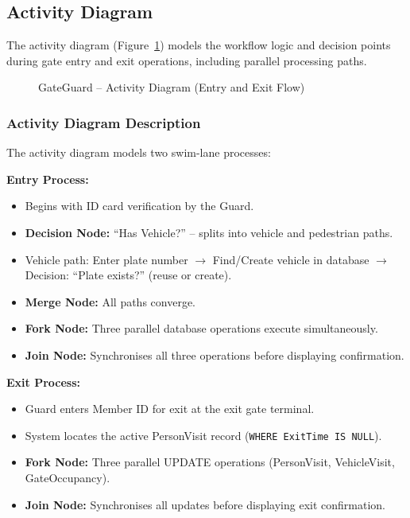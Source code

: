 \documentclass[a4paper, 12pt]{article}
\begin{document}
\newpage
\subsection{Activity Diagram}
\label{subsec:activity}

The activity diagram (Figure~\ref{fig:activity}) models the workflow logic and decision points during gate entry and exit operations, including parallel processing paths.

\begin{figure}[H]
    \centering
    \mbox{}
    \caption{GateGuard -- Activity Diagram (Entry and Exit Flow)}
    \label{fig:activity}
\end{figure}

\newpage
\mbox{}
\newpage


\subsubsection{Activity Diagram Description}

The activity diagram models two swim-lane processes:

\textbf{Entry Process:}
\begin{itemize}[leftmargin=*, nosep]
    \item Begins with ID card verification by the Guard.
    \item \textbf{Decision Node:} ``Has Vehicle?'' -- splits into vehicle and pedestrian paths.
    \item Vehicle path: Enter plate number $\rightarrow$ Find/Create vehicle in database $\rightarrow$ Decision: ``Plate exists?'' (reuse or create).
    \item \textbf{Merge Node:} All paths converge.
    \item \textbf{Fork Node:} Three parallel database operations execute simultaneously.
    \item \textbf{Join Node:} Synchronises all three operations before displaying confirmation.
\end{itemize}

\textbf{Exit Process:}
\begin{itemize}[leftmargin=*, nosep]
    \item Guard enters Member ID for exit at the exit gate terminal.
    \item System locates the active PersonVisit record (\texttt{WHERE ExitTime IS NULL}).
    \item \textbf{Fork Node:} Three parallel UPDATE operations (PersonVisit, VehicleVisit, GateOccupancy).
    \item \textbf{Join Node:} Synchronises all updates before displaying exit confirmation.
\end{itemize}
\end{document}
